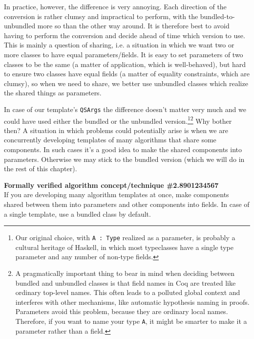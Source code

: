 \documentclass[declaration,mgr,english,shortabstract]{iithesis}
\newcommand{\m}[1]{\texttt{#1}}
\begin{document}
In practice, however, the difference is very annoying. Each direction of the conversion is rather clumsy and impractical to perform, with the bundled-to-unbundled more so than the other way around. It is therefore best to avoid having to perform the conversion and decide ahead of time which version to use. This is mainly a question of sharing, i.e. a situation in which we want two or more classes to have equal parameters/fields. It is easy to set parameters of two classes to be the same (a matter of application, which is well-behaved), but hard to ensure two classes have equal fields (a matter of equality constraints, which are clumsy), so when we need to share, we better use unbundled classes which realize the shared things as parameters.

In case of our template's \m{QSArgs} the difference doesn't matter very much and we could have used either the bundled or the unbundled version.\footnote{Our original choice, with \m{A\ :\ Type} realized as a parameter, is probably a cultural heritage of Haskell, in which most typeclasses have a single type parameter and any number of non-type fields.}\footnote{A pragmatically important thing to bear in mind when deciding between bundled and unbundled classes is that field names in Coq are treated like ordinary top-level names. This often leads to a polluted global context and interferes with other mechanisms, like automatic hypothesis naming in proofs. Parameters avoid this problem, because they are ordinary local names. Therefore, if you want to name your type \m{A}, it might be smarter to make it a parameter rather than a field.} Why bother then? A situation in which problems could potentially arise is when we are concurrently developing templates of many algorithms that share some components. In such cases it's a good idea to make the shared components into parameters. Otherwise we may stick to the bundled version (which we will do in the rest of this chapter).

\begin{center}
    \textbf{Formally verified algorithm concept/technique \#2.8901234567} \\
    If you are developing many algorithm templates at once, make components shared between them into parameters and other components into fields. In case of a single template, use a bundled class by default.
\end{center}

\end{document}
